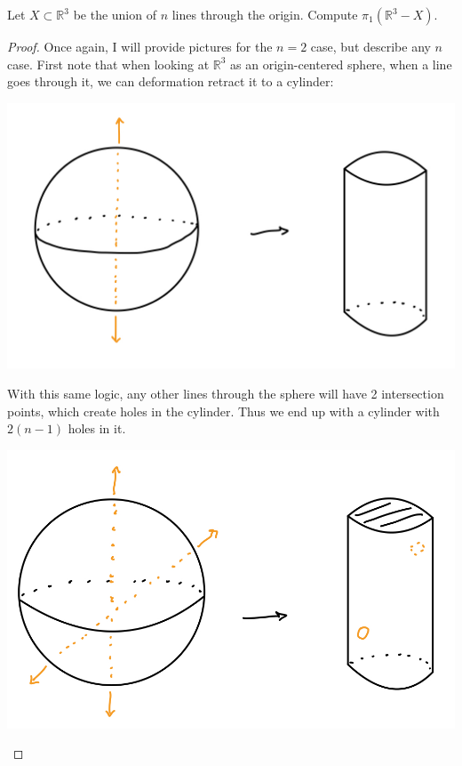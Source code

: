 \documentclass[12pt]{article}
\newenvironment{statement}[2][Statement]{\begin{trivlist}
\item[\hskip \labelsep {\bfseries #1}\hskip \labelsep {\bfseries #2.}]}{\end{trivlist}}
\begin{document}
\begin{statement}[Problem]{2}
  Let $X \subset \mathbb{R}^3$ be the union of $n$ lines through the origin. Compute $\pi_1(\mathbb{R}^3 - X)$. 
\end{statement}
\begin{proof}
  Once again, I will provide pictures for the $n=2$ case, but describe any $n$ case. First note that when looking at 
  $\mathbb{R}^3$ as an origin-centered sphere, when a line goes through it, we can deformation retract it to a cylinder:
  \par \begin{center} \includegraphics[scale=.2]{2-1.jpg} \end{center}
  \par With this same logic, any other lines through the sphere will have 2 intersection points, which create holes in the cylinder. 
  Thus we end up with a cylinder with $2(n-1)$ holes in it. 
  \par \begin{center} \includegraphics[scale=.2]{2-2.jpg} \end{center}

\end{proof}
\end{document}
